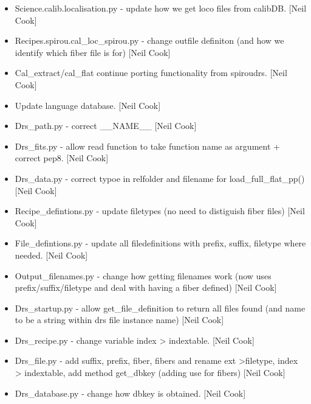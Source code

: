 \documentclass[a4paper,10pt,english]{report}
\begin{document}
\begin{itemize}
\item {} 
Science.calib.localisation.py - update how we get loco files from
calibDB. {[}Neil Cook{]}

\item {} 
Recipes.spirou.cal\_loc\_spirou.py - change outfile definiton (and how
we identify which fiber file is for) {[}Neil Cook{]}

\item {} 
Cal\_extract/cal\_flat \textendash{} continue porting functionality from spiroudrs.
{[}Neil Cook{]}

\item {} 
Update language database. {[}Neil Cook{]}

\item {} 
Drs\_path.py - correct \_\_NAME\_\_ {[}Neil Cook{]}

\item {} 
Drs\_fits.py - allow read function to take function name as argument +
correct pep8. {[}Neil Cook{]}

\item {} 
Drs\_data.py - correct typoe in relfolder and filename for
load\_full\_flat\_pp() {[}Neil Cook{]}

\item {} 
Recipe\_defintions.py - update filetypes (no need to distiguish fiber
files) {[}Neil Cook{]}

\item {} 
File\_defintions.py - update all filedefinitions with prefix, suffix,
filetype where needed. {[}Neil Cook{]}

\item {} 
Output\_filenames.py - change how getting filenames work (now uses
prefix/suffix/filetype and deal with having a fiber defined) {[}Neil
Cook{]}

\item {} 
Drs\_startup.py - allow get\_file\_definition to return all files found
(and name to be a string within drs file instance name) {[}Neil Cook{]}

\item {} 
Drs\_recipe.py - change variable index \textendash{}\textgreater{} indextable. {[}Neil Cook{]}

\item {} 
Drs\_file.py - add suffix, prefix, fiber, fibers and rename ext
\textendash{}\textgreater{}filetype, index \textendash{}\textgreater{} indextable, add method get\_dbkey (adding use
for fibers) {[}Neil Cook{]}

\item {} 
Drs\_database.py - change how dbkey is obtained. {[}Neil Cook{]}

\end{itemize}
\end{document}
